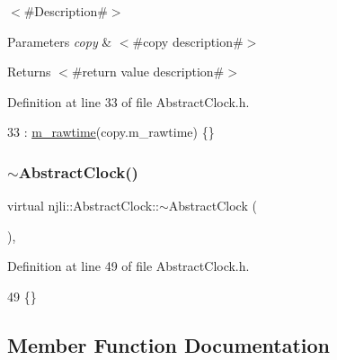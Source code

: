 $<$\#\+Description\#$>$


\begin{DoxyParams}{Parameters}
{\em copy} & $<$\#copy description\#$>$\\
\hline
\end{DoxyParams}
\begin{DoxyReturn}{Returns}
$<$\#return value description\#$>$ 
\end{DoxyReturn}


Definition at line 33 of file Abstract\+Clock.\+h.


\begin{DoxyCode}
33 : \mbox{\hyperlink{classnjli_1_1_abstract_clock_a668e9ea61bf8c76643255af6b65f2a59}{m\_rawtime}}(copy.m\_rawtime) \{\}
\end{DoxyCode}
\mbox{\label{classnjli_1_1_abstract_clock_a41aac7ee2287261e3b9e7fff9863f821}} 
\subsubsection{\texorpdfstring{$\sim$\+Abstract\+Clock()}{~AbstractClock()}}
{\footnotesize\ttfamily virtual njli\+::\+Abstract\+Clock\+::$\sim$\+Abstract\+Clock (\begin{DoxyParamCaption}{ }\end{DoxyParamCaption})\hspace{0.3cm}{\ttfamily [inline]}, {\ttfamily [virtual]}}



Definition at line 49 of file Abstract\+Clock.\+h.


\begin{DoxyCode}
49 \{\}
\end{DoxyCode}


\subsection{Member Function Documentation}
\mbox{\label{classnjli_1_1_abstract_clock_ada0417b7564b9cdee7357191f33ea448}} 
